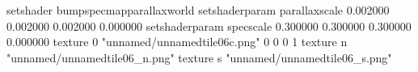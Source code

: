 setshader bumpspecmapparallaxworld
setshaderparam parallaxscale 0.002000 0.002000 0.002000 0.000000
setshaderparam specscale 0.300000 0.300000 0.300000 0.000000
texture 0 "unnamed/unnamedtile06c.png" 0 0 0 1
texture n "unnamed/unnamedtile06_n.png"
texture s "unnamed/unnamedtile06_s.png"